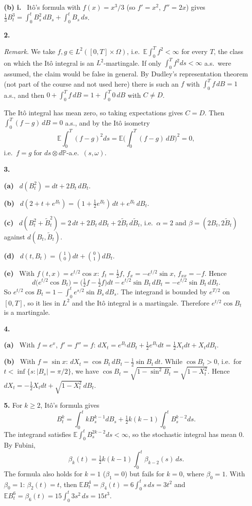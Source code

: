 \documentclass[11pt,a4paper]{article}
\newcommand{\E}{\mathbb{E}}
\renewcommand{\P}{\mathbb{P}}
\newcommand{\1}{\mathbf{1}}
\newcommand{\prob}[1]{\par\medskip\noindent\textbf{#1}\quad}
\newcommand{\sub}[1]{\par\smallskip\noindent\textbf{#1}\ }
\newcommand{\note}[1]{\par\noindent\emph{Remark.} #1}
\begin{document}
\sub{(b) i.} Itô's formula with $f(x)=x^3/3$ (so $f'=x^2$, $f''=2x$) gives
$\frac13B_t^3=\int_0^tB_s^2\,dB_s+\int_0^tB_s\,ds$.

\prob{2.}
\note{We take $f,g\in L^2([0,T]\times\Omega)$, i.e.\ $\E\int_0^Tf^2<\infty$ for every $T$, the class on which the Itô integral is
an $L^2$-martingale. If only $\int_0^Tf^2ds<\infty$ a.s.\ were assumed, the claim would be false in
general. By Dudley's representation theorem (not part of the course and not used here) there is such an $f$ with
$\int_0^Tf\,dB=1$ a.s., and then $0+\int_0^Tf\,dB=1+\int_0^T0\,dB$ with $C\ne D$.}

The Itô integral has mean zero, so taking expectations gives $C=D$. Then $\int_0^T(f-g)\,dB=0$ a.s., and by the Itô
isometry
\[\E\int_0^T(f-g)^2ds=\E\Big(\int_0^T(f-g)\,dB\Big)^2=0,\]
i.e.\ $f=g$ for $ds\otimes d\P$-a.e.\ $(s,\omega)$.

\prob{3.}
\sub{(a)} $d(B_t^2)=dt+2B_t\,dB_t$.

\sub{(b)} $d(2+t+e^{B_t})=(1+\tfrac12e^{B_t})\,dt+e^{B_t}\,dB_t$.

\sub{(c)} $d(B_t^2+\tilde B_t^2)=2\,dt+2B_t\,dB_t+2\tilde B_t\,d\tilde B_t$, i.e.\ $\alpha=2$ and $\beta=(2B_t,2\tilde B_t)$ against
$d(B_t,\tilde B_t)$.

\sub{(d)} $d(t,B_t)=\binom10dt+\binom01dB_t$.

\sub{(e)} With $f(t,x)=e^{t/2}\cos x$: $f_t=\frac12f$, $f_x=-e^{t/2}\sin x$, $f_{xx}=-f$. Hence
\[
d\big(e^{t/2}\cos B_t\big)=\big(\tfrac12f-\tfrac12f\big)dt-e^{t/2}\sin B_t\,dB_t=-e^{t/2}\sin B_t\,dB_t .
\]
So $e^{t/2}\cos B_t=1-\int_0^te^{s/2}\sin B_s\,dB_s$. The integrand is bounded by $e^{T/2}$ on $[0,T]$, so it lies in $L^2$ and
the Itô integral is a martingale. Therefore $e^{t/2}\cos B_t$ is a martingale.

\prob{4.}
\sub{(a)} With $f=e^x$, $f'=f''=f$: $dX_t=e^{B_t}dB_t+\frac12e^{B_t}dt=\frac12X_tdt+X_tdB_t$.

\sub{(b)} With $f=\sin x$: $dX_t=\cos B_t\,dB_t-\frac12\sin B_t\,dt$. While $\cos B_t>0$, i.e.\ for
$t<\inf\{s:|B_s|=\pi/2\}$, we have $\cos B_t=\sqrt{1-\sin^2B_t}=\sqrt{1-X_t^2}$. Hence
$dX_t=-\frac12X_tdt+\sqrt{1-X_t^2}\,dB_t$.

\prob{5.}
For $k\ge2$, Itô's formula gives
\[B_t^k=\int_0^tkB_s^{k-1}dB_s+\tfrac12k(k-1)\int_0^tB_s^{k-2}ds.\]
The integrand satisfies $\E\int_0^tB_s^{2k-2}ds<\infty$, so the stochastic integral has mean $0$. By Fubini,
\[\beta_k(t)=\tfrac12k(k-1)\int_0^t\beta_{k-2}(s)\,ds.\]
The formula also holds for $k=1$ ($\beta_1=0$) but fails for $k=0$, where $\beta_0=1$. With $\beta_0=1$:
$\beta_2(t)=t$, then $\E B_t^4=\beta_4(t)=6\int_0^ts\,ds=3t^2$ and $\E B_t^6=\beta_6(t)=15\int_0^t3s^2\,ds=15t^3$.
\end{document}
